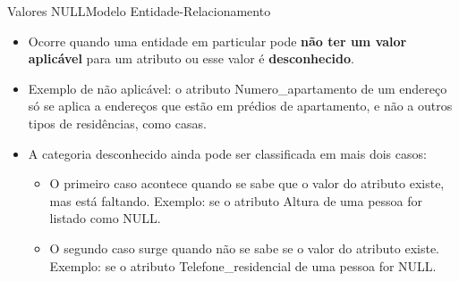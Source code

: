 \documentclass[t]{beamer}
\begin{document}

\begin{ftst}{Valores NULL}{Modelo Entidade-Relacionamento}
\begin{itemize}
    \item Ocorre quando uma entidade em particular pode \textbf{não ter um valor aplicável} para um atributo ou esse valor é \textbf{desconhecido}.
    
    \item Exemplo de não aplicável: o atributo Numero\_apartamento de um endereço só se aplica a endereços que estão em prédios de apartamento, e não a outros tipos de residências, como casas.
    
    \item A categoria desconhecido ainda pode ser classificada em mais dois casos:
    \begin{itemize}
        \item O primeiro caso acontece quando se sabe que o valor do atributo existe, mas está faltando. Exemplo: se o atributo Altura de uma pessoa for listado como NULL.
        \item O segundo caso surge quando não se sabe se o valor do atributo existe. Exemplo: se o atributo Telefone\_residencial de uma pessoa for NULL.
    \end{itemize} 
\end{itemize}


\end{ftst}

\end{document}
